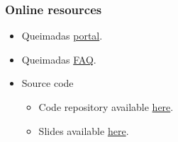 \begin{frame}
  \frametitle{Online resources}
  \begin{itemize}
    \item Queimadas \href{https://terrabrasilis.dpi.inpe.br/queimadas/portal/}
      {portal}.
    \item Queimadas
      \href{https://terrabrasilis.dpi.inpe.br/queimadas/portal/pages/secao_informacoes/faq/index.html}
      {FAQ}.
    \item Source code
      \begin{itemize}
      \item Code repository available 
        \href{https://github.com/albhasan/queimadas}{here}.
      \item Slides available \href{https://github.com/albhasan/slides/queimadas}
        {here}.
      \end{itemize}
  \end{itemize}
\end{frame}
